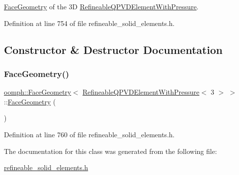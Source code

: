 \hyperlink{classoomph_1_1FaceGeometry}{Face\+Geometry} of the 3D \hyperlink{classoomph_1_1RefineableQPVDElementWithPressure}{Refineable\+Q\+P\+V\+D\+Element\+With\+Pressure}. 

Definition at line 754 of file refineable\+\_\+solid\+\_\+elements.\+h.



\subsection{Constructor \& Destructor Documentation}
\mbox{\label{classoomph_1_1FaceGeometry_3_01RefineableQPVDElementWithPressure_3_013_01_4_01_4_af2338c354e59493098ff39f995bd4000}} 
\subsubsection{\texorpdfstring{Face\+Geometry()}{FaceGeometry()}}
{\footnotesize\ttfamily \hyperlink{classoomph_1_1FaceGeometry}{oomph\+::\+Face\+Geometry}$<$ \hyperlink{classoomph_1_1RefineableQPVDElementWithPressure}{Refineable\+Q\+P\+V\+D\+Element\+With\+Pressure}$<$ 3 $>$ $>$\+::\hyperlink{classoomph_1_1FaceGeometry}{Face\+Geometry} (\begin{DoxyParamCaption}{ }\end{DoxyParamCaption})\hspace{0.3cm}{\ttfamily [inline]}}



Definition at line 760 of file refineable\+\_\+solid\+\_\+elements.\+h.



The documentation for this class was generated from the following file\+:\begin{DoxyCompactItemize}
\item 
\hyperlink{refineable__solid__elements_8h}{refineable\+\_\+solid\+\_\+elements.\+h}\end{DoxyCompactItemize}
